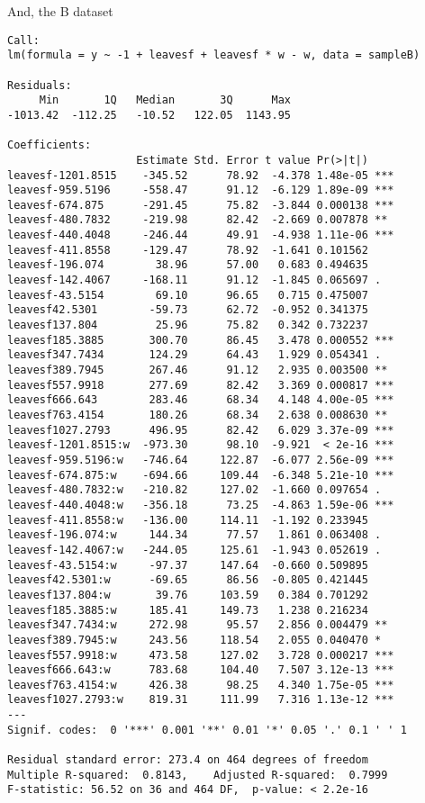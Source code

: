 \documentclass{article}
\begin{document}
And, the B dataset

\begin{verbatim}
Call:
lm(formula = y ~ -1 + leavesf + leavesf * w - w, data = sampleB)

Residuals:
     Min       1Q   Median       3Q      Max 
-1013.42  -112.25   -10.52   122.05  1143.95 

Coefficients:
                    Estimate Std. Error t value Pr(>|t|)    
leavesf-1201.8515    -345.52      78.92  -4.378 1.48e-05 ***
leavesf-959.5196     -558.47      91.12  -6.129 1.89e-09 ***
leavesf-674.875      -291.45      75.82  -3.844 0.000138 ***
leavesf-480.7832     -219.98      82.42  -2.669 0.007878 ** 
leavesf-440.4048     -246.44      49.91  -4.938 1.11e-06 ***
leavesf-411.8558     -129.47      78.92  -1.641 0.101562    
leavesf-196.074        38.96      57.00   0.683 0.494635    
leavesf-142.4067     -168.11      91.12  -1.845 0.065697 .  
leavesf-43.5154        69.10      96.65   0.715 0.475007    
leavesf42.5301        -59.73      62.72  -0.952 0.341375    
leavesf137.804         25.96      75.82   0.342 0.732237    
leavesf185.3885       300.70      86.45   3.478 0.000552 ***
leavesf347.7434       124.29      64.43   1.929 0.054341 .  
leavesf389.7945       267.46      91.12   2.935 0.003500 ** 
leavesf557.9918       277.69      82.42   3.369 0.000817 ***
leavesf666.643        283.46      68.34   4.148 4.00e-05 ***
leavesf763.4154       180.26      68.34   2.638 0.008630 ** 
leavesf1027.2793      496.95      82.42   6.029 3.37e-09 ***
leavesf-1201.8515:w  -973.30      98.10  -9.921  < 2e-16 ***
leavesf-959.5196:w   -746.64     122.87  -6.077 2.56e-09 ***
leavesf-674.875:w    -694.66     109.44  -6.348 5.21e-10 ***
leavesf-480.7832:w   -210.82     127.02  -1.660 0.097654 .  
leavesf-440.4048:w   -356.18      73.25  -4.863 1.59e-06 ***
leavesf-411.8558:w   -136.00     114.11  -1.192 0.233945    
leavesf-196.074:w     144.34      77.57   1.861 0.063408 .  
leavesf-142.4067:w   -244.05     125.61  -1.943 0.052619 .  
leavesf-43.5154:w     -97.37     147.64  -0.660 0.509895    
leavesf42.5301:w      -69.65      86.56  -0.805 0.421445    
leavesf137.804:w       39.76     103.59   0.384 0.701292    
leavesf185.3885:w     185.41     149.73   1.238 0.216234    
leavesf347.7434:w     272.98      95.57   2.856 0.004479 ** 
leavesf389.7945:w     243.56     118.54   2.055 0.040470 *  
leavesf557.9918:w     473.58     127.02   3.728 0.000217 ***
leavesf666.643:w      783.68     104.40   7.507 3.12e-13 ***
leavesf763.4154:w     426.38      98.25   4.340 1.75e-05 ***
leavesf1027.2793:w    819.31     111.99   7.316 1.13e-12 ***
---
Signif. codes:  0 '***' 0.001 '**' 0.01 '*' 0.05 '.' 0.1 ' ' 1

Residual standard error: 273.4 on 464 degrees of freedom
Multiple R-squared:  0.8143,	Adjusted R-squared:  0.7999 
F-statistic: 56.52 on 36 and 464 DF,  p-value: < 2.2e-16
\end{verbatim}
\end{document}
